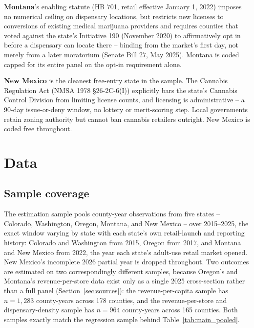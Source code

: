 \documentclass[12pt]{article}
\begin{document}
\textbf{Montana}'s enabling statute (HB 701, retail effective January 1, 2022) imposes no numerical ceiling on
dispensary locations, but restricts new licenses to conversions of existing medical marijuana providers and
requires counties that voted against the state's Initiative 190 (November 2020) to affirmatively opt in before
a dispensary can locate there -- binding from the market's first day, not merely from a later moratorium
(Senate Bill 27, May 2025). Montana is coded capped for its entire panel on the opt-in requirement alone.

\textbf{New Mexico} is the cleanest free-entry state in the sample. The Cannabis Regulation Act (NMSA 1978
\S 26-2C-6(I)) explicitly bars the state's Cannabis Control Division from limiting license counts, and
licensing is administrative -- a 90-day issue-or-deny window, no lottery or merit-scoring step. Local
governments retain zoning authority but cannot ban cannabis retailers outright. New Mexico is coded free
throughout.

\section{Data}
\label{sec:data}

\subsection{Sample coverage}
\label{sec:samplecoverage}

The estimation sample pools county-year observations from five states -- Colorado, Washington, Oregon,
Montana, and New Mexico -- over 2015--2025, the exact window varying by state with each state's own
retail-launch and reporting history: Colorado and Washington from 2015, Oregon from 2017, and Montana and New
Mexico from 2022, the year each state's adult-use retail market opened. New Mexico's incomplete 2026 partial
year is dropped throughout. Two outcomes are estimated on two correspondingly different samples, because
Oregon's and Montana's revenue-per-store data exist only as a single 2025 cross-section rather than a full
panel (Section~\ref{sec:sources}): the revenue-per-capita sample has $n=1{,}283$ county-years across 178
counties, and the revenue-per-store and dispensary-density sample has $n=964$ county-years across 165
counties. Both samples exactly match the regression sample behind Table~\ref{tab:main_pooled}.
\end{document}
